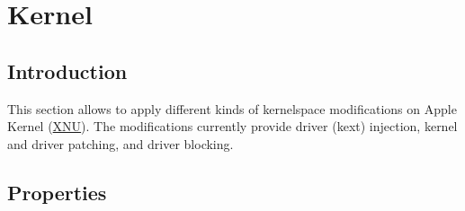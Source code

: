 \documentclass[]{article}
\begin{document}
\section{Kernel}\label{kernel}

\subsection{Introduction}\label{kernelintro}

This section allows to apply different kinds of kernelspace modifications on
Apple Kernel (\href{https://opensource.apple.com/source/xnu}{XNU}). The modifications
currently provide driver (kext) injection, kernel and driver patching, and driver
blocking.

\subsection{Properties}\label{kernelprops}
\end{document}
